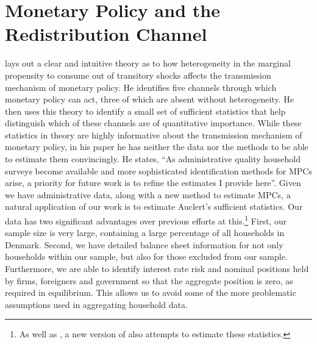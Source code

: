 \documentclass[titlepage]{\econtex}\newcommand{\texname}{ConsumptionHeterogeneity}
\begin{document}
\section{Monetary Policy and the Redistribution Channel} \label{monetary_policy}
\cite{auclert_monetary_2017} lays out a clear and intuitive theory as to how heterogeneity in the marginal propensity to consume out of transitory shocks affects the transmission mechanism of monetary policy. He identifies five channels through which monetary policy can act, three of which are absent without heterogeneity. He then uses this theory to identify a small set of sufficient statistics that help distinguish which of these channels are of quantitative importance. While these statistics in theory are highly informative about the transmission mechanism of monetary policy, in his paper he has neither the data nor the methods to be able to estimate them convincingly. He states, ``As administrative quality household surveys become available and more sophisticated identification methods for MPCs arise, a priority for future work is to refine the estimates I provide here''. Given we have administrative data, along with a new method to estimate MPCs, a natural application of our work is to estimate Auclert's sufficient statistics. Our data has two significant advantages over previous efforts at this.\footnote{As well as \cite{auclert_monetary_2017}, a new version of \cite{fagereng_mpc_2016} also attempts to estimate these statistics.} First, our sample size is very large, containing a large percentage of all households in Denmark. Second, we have detailed balance sheet information for not only households within our sample, but also for those excluded from our sample. Furthermore, we are able to identify interest rate risk and nominal positions held by firms, foreigners and government so that the aggregate position is zero, as required in equilibrium. This allows us to avoid some of the more problematic assumptions used in aggregating household data.
\end{document}
